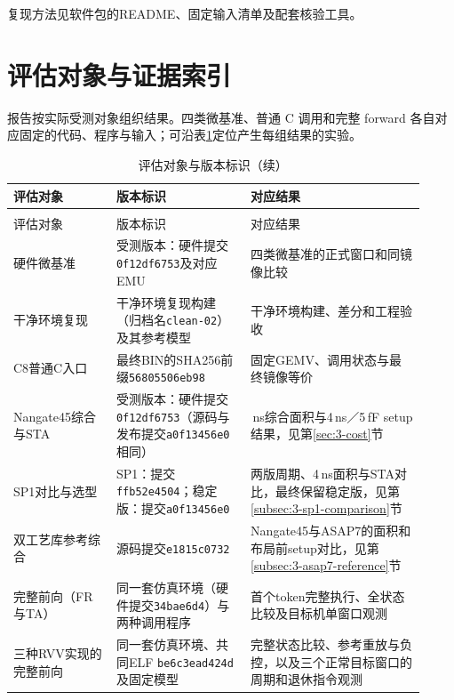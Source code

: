 复现方法见软件包的README、固定输入清单及配套核验工具。


\section{评估对象与证据索引}

报告按实际受测对象组织结果。四类微基准、普通 C 调用和完整 forward 各自对应固定的代码、程序与输入；可沿表\ref{tab:3-eval-index}定位产生每组结果的实验。

{\small\setlength{\tabcolsep}{4pt}
\begin{longtable}{>{\raggedright\arraybackslash}p{0.23\linewidth}>{\raggedright\arraybackslash}p{0.30\linewidth}>{\raggedright\arraybackslash}p{0.39\linewidth}}
\caption{评估对象与版本标识}\label{tab:3-eval-index}\\
\toprule
评估对象 & 版本标识 & 对应结果\\
\midrule\endfirsthead
\caption[]{评估对象与版本标识（续）}\\
\toprule
评估对象 & 版本标识 & 对应结果\\
\midrule\endhead
硬件微基准 & 受测版本：硬件提交\texttt{0f12df6753}及对应EMU & 四类微基准的正式窗口和同镜像比较\\
干净环境复现 & 干净环境复现构建（归档名\texttt{clean-02}）及其参考模型 & 干净环境构建、差分和工程验收\\
C8普通C入口 & 最终BIN的SHA256前缀\texttt{56805506eb98} & 固定GEMV、调用状态与最终镜像等价\\
Nangate45综合与STA & 受测版本：硬件提交\texttt{0f12df6753}（源码与发布提交\texttt{a0f13456e0}相同） & 4\,ns综合面积与4\,ns／5\,fF setup结果，见第\ref{sec:3-cost}节\\
SP1对比与选型 & SP1：提交\texttt{ffb52e4504}；稳定版：提交\texttt{a0f13456e0} & 两版周期、4\,ns面积与STA对比，最终保留稳定版，见第\ref{subsec:3-sp1-comparison}节\\
双工艺库参考综合 & 源码提交\texttt{e1815c0732} & Nangate45与ASAP7的面积和布局前setup对比，见第\ref{subsec:3-asap7-reference}节\\
完整前向（FR与TA） & 同一套仿真环境（硬件提交\texttt{34bae6d4}）与两种调用程序 & 首个token完整执行、全状态比较及目标机单窗口观测\\
三种RVV实现的完整前向 & 同一套仿真环境、共同ELF \texttt{be6c3ead424d}及固定模型 & 完整状态比较、参考重放与负控，以及三个正常目标窗口的周期和退休指令观测\\
\bottomrule
\end{longtable}}

